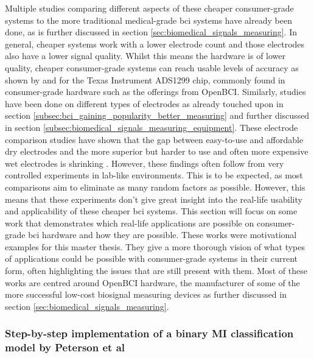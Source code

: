 Multiple studies comparing different aspects of these cheaper consumer-grade systems to the more traditional medical-grade \gls{bci} systems have already been done, as is further discussed in section \ref{sec:biomedical_signals_measuring}.
In general, cheaper systems work with a lower electrode count and those electrodes also have a lower signal quality.
Whilst this means the hardware is of lower quality, cheaper consumer-grade systems can reach usable levels of accuracy as shown by \citet{openbci_vs_medical} and \citet{openbci_eeg_sensor_evaluation} for the Texas Instrument ADS1299 chip, commonly found in consumer-grade hardware such as the offerings from OpenBCI.
Similarly, studies have been done on different types of electrodes as already touched upon in section \ref{subsec:bci_gaining_popularity_better_measuring} and further discussed in section \ref{subsec:biomedical_signals_measuring_equipment}.
These electrode comparison studies have shown that the gap between easy-to-use and affordable dry electrodes and the more superior but harder to use and often more expensive wet electrodes is shrinking \citep{wet_vs_dry, dry_electrode_status, wet_dry_comparison_experiment}.
However, these findings often follow from very controlled experiments in lab-like environments.
This is to be expected, as most comparisons aim to eliminate as many random factors as possible.
However, this means that these experiments don't give great insight into the real-life usability and applicability of these cheaper \gls{bci} systems.
This section will focus on some work that demonstrates which real-life applications are possible on consumer-grade \gls{bci} hardware and how they are possible.
These works were motivational examples for this master thesis.
They give a more thorough vision of what types of applications could be possible with consumer-grade systems in their current form, often highlighting the issues that are still present with them.
Most of these works are centred around OpenBCI hardware, the manufacturer of some of the more successful low-cost \gls{biosignal} measuring devices as further discussed in section \ref{sec:biomedical_signals_measuring}.


\subsubsection{Step-by-step implementation of a binary MI classification model by Peterson et al}
\label{subsubsec:bci_small_projects_motivating_examples_binary}

